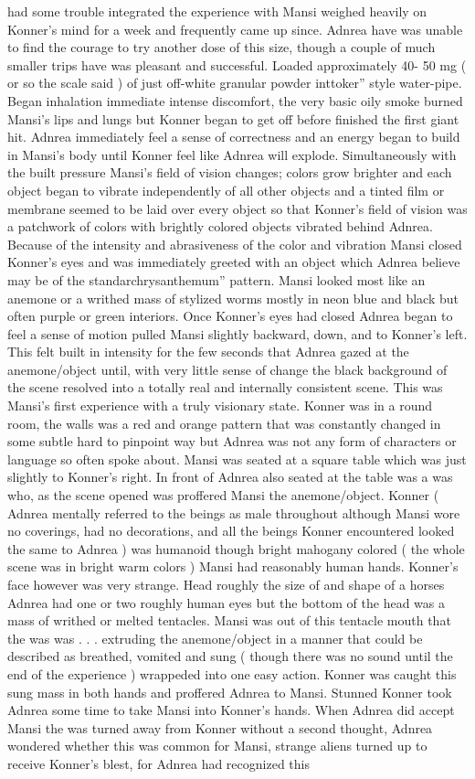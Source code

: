\documentclass[12pt]{book}
\begin{document}
had some trouble integrated the experience with Mansi weighed heavily on Konner's mind for a week and frequently came up since. Adnrea have was unable to find the courage to try another dose of this size, though a couple of much smaller trips have was pleasant and successful. Loaded approximately 40- 50 mg ( or so the scale said ) of just off-white granular powder inttoker'' style water-pipe. Began inhalation immediate intense discomfort, the very basic oily smoke burned Mansi's lips and lungs but Konner began to get off before finished the first giant hit. Adnrea immediately feel a sense of correctness and an energy began to build in Mansi's body until Konner feel like Adnrea will explode. Simultaneously with the built pressure Mansi's field of vision changes; colors grow brighter and each object began to vibrate independently of all other objects and a tinted film or membrane seemed to be laid over every object so that Konner's field of vision was a patchwork of colors with brightly colored objects vibrated behind Adnrea. Because of the intensity and abrasiveness of the color and vibration Mansi closed Konner's eyes and was immediately greeted with an object which Adnrea believe may be of the standarchrysanthemum'' pattern. Mansi looked most like an anemone or a writhed mass of stylized worms mostly in neon blue and black but often purple or green interiors. Once Konner's eyes had closed Adnrea began to feel a sense of motion pulled Mansi slightly backward, down, and to Konner's left. This felt built in intensity for the few seconds that Adnrea gazed at the anemone/object until, with very little sense of change the black background of the scene resolved into a totally real and internally consistent scene. This was Mansi's first experience with a truly visionary state. Konner was in a round room, the walls was a red and orange pattern that was constantly changed in some subtle hard to pinpoint way but Adnrea was not any form of characters or language so often spoke about. Mansi was seated at a square table which was just slightly to Konner's right. In front of Adnrea also seated at the table was a was who, as the scene opened was proffered Mansi the anemone/object. Konner ( Adnrea mentally referred to the beings as male throughout although Mansi wore no coverings, had no decorations, and all the beings Konner encountered looked the same to Adnrea ) was humanoid though bright mahogany colored ( the whole scene was in bright warm colors ) Mansi had reasonably human hands. Konner's face however was very strange. Head roughly the size of and shape of a horses Adnrea had one or two roughly human eyes but the bottom of the head was a mass of writhed or melted tentacles. Mansi was out of this tentacle mouth that the was was . . . extruding the anemone/object in a manner that could be described as breathed, vomited and sung ( though there was no sound until the end of the experience ) wrappeded into one easy action. Konner was caught this sung mass in both hands and proffered Adnrea to Mansi. Stunned Konner took Adnrea some time to take Mansi into Konner's hands. When Adnrea did accept Mansi the was turned away from Konner without a second thought, Adnrea wondered whether this was common for Mansi, strange aliens turned up to receive Konner's blest, for Adnrea had recognized this 
\end{document}
